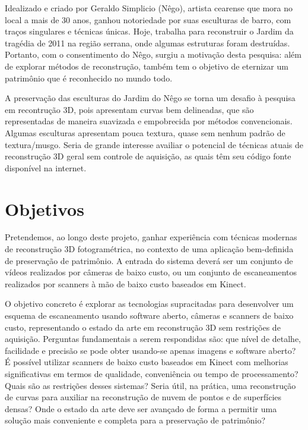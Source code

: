 Idealizado e criado por Geraldo Simplicio (Nêgo), artista cearense que mora no 
local a mais de 30 anos, ganhou notoriedade por suas esculturas de barro, com traços 
singulares e técnicas únicas. Hoje, trabalha para reconstruir o Jardim da tragédia de 
2011 na região serrana, onde algumas estruturas foram destruídas. Portanto, com o 
consentimento do Nêgo, surgiu a motivação desta pesquisa: além de explorar métodos de 
reconstrução, também tem o objetivo de eternizar um patrimônio que é reconhecido no mundo
todo.

A preservação das esculturas do Jardim do Nêgo se torna um desafio à pesquisa em
recontrução 3D, pois apresentam curvas bem delineadas, que são 
representadas de maneira suavizada e empobrecida por métodos convencionais.
Algumas esculturas apresentam pouca textura, quase sem nenhum padrão de textura/musgo.
Seria de grande interesse availiar o potencial de técnicas atuais de
reconstrução 3D geral sem controle de aquisição, as quais têm seu código fonte
disponível na internet.

\section*{Objetivos}

Pretendemos, ao longo deste projeto, ganhar experiência com técnicas
modernas de reconstrução 3D fotogramétrica, no contexto de uma aplicação
bem-definida de preservação de patrimônio. A entrada do sistema deverá ser um
conjunto de vídeos realizados por câmeras de baixo custo, ou um conjunto de
escaneamentos realizados por scanners à mão de baixo custo baseados em Kinect.

O objetivo concreto é explorar as tecnologias supracitadas para
desenvolver um esquema de escaneamento usando software aberto, câmeras e
scanners de baixo custo, representando o estado da arte em reconstrução 3D sem
restrições de aquisição. Perguntas fundamentais a serem respondidas são: que
nível de detalhe, facilidade e precisão se pode obter usando-se apenas imagens e software
aberto? É possível utilizar scanners de baixo custo baseados em Kinect com
melhorias significativas em termos de qualidade, conveniência ou tempo de
processamento?  Quais são as restrições desses sistemas? Seria útil, na prática,
uma reconstrução de curvas para auxiliar na reconstrução de nuvem de pontos e de
superfícies densas? Onde o estado da arte deve ser avançado de forma a permitir
uma solução mais conveniente e completa para a preservação de patrimônio?

